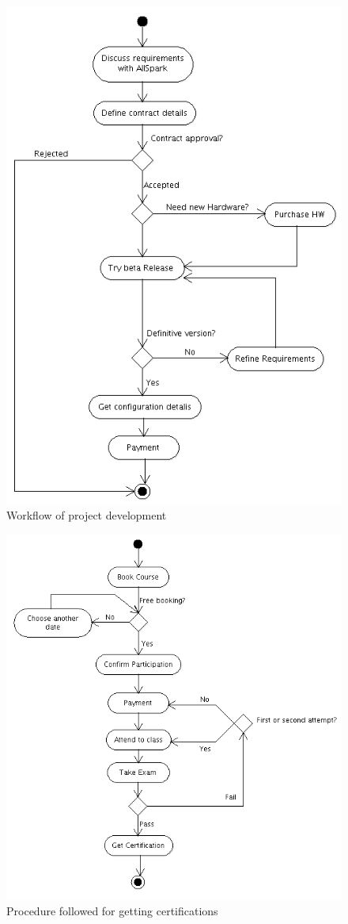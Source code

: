 \begin{figure}
\centering
\includegraphics[scale=0.70]{argouml_diags/imgs/secur}
\caption{Workflow of project development}
\label{img:secur}
\end{figure}

\begin{figure}
\centering
\includegraphics[scale=0.75]{argouml_diags/imgs/certs}
\caption{Procedure followed for getting certifications}
\label{img:certs}
\end{figure}

